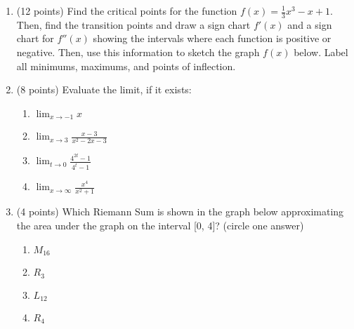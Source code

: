 \documentclass[11pt]{article}
\begin{document}
\begin{enumerate}[itemsep=30pt]
\newpage


\item (12 points) Find the critical points for the function $f(x) = \frac{1}{3}x^3 -x + 1$. Then, find the transition points and draw a sign chart $f'(x)$ and a sign chart for $f''(x)$ showing the intervals where each function is positive or negative. Then, use this information to sketch the graph $f(x)$ below. Label all minimums, maximums, and points of inflection.
\\

\vspace{80 mm}

\vspace{10pt}
\begin{center}
\end{center}


\newpage


\item (8 points) Evaluate the limit, if it exists:
\begin{multicols}{2}
\begin{enumerate}[itemsep=50pt]
    \item $\displaystyle{\lim_{x \to -1} x}$
    \item $\displaystyle{\lim_{x \to 3} \frac{x - 3}{x^2 - 2x - 3}}$
    \item $\displaystyle{\lim_{t \to 0} \frac{4^{2t} - 1}{4^t - 1}}$
    \item $\displaystyle{\lim_{x \to \infty} \frac{x^4}{x^2 + 1}}$
\end{enumerate}
\end{multicols}

\vspace{50pt}

\item (4 points) Which Riemann Sum is shown in the graph below approximating the area under the graph on the interval [0, 4]? (circle one answer)
\begin{multicols}{2}
\begin{enumerate}[itemsep=5pt]
    \item $M_{16}$
    \item $R_{3}$
    \item $L_{12}$
    \item $R_{4}$
\end{enumerate}
\end{multicols}


\end{enumerate}
\end{document}
